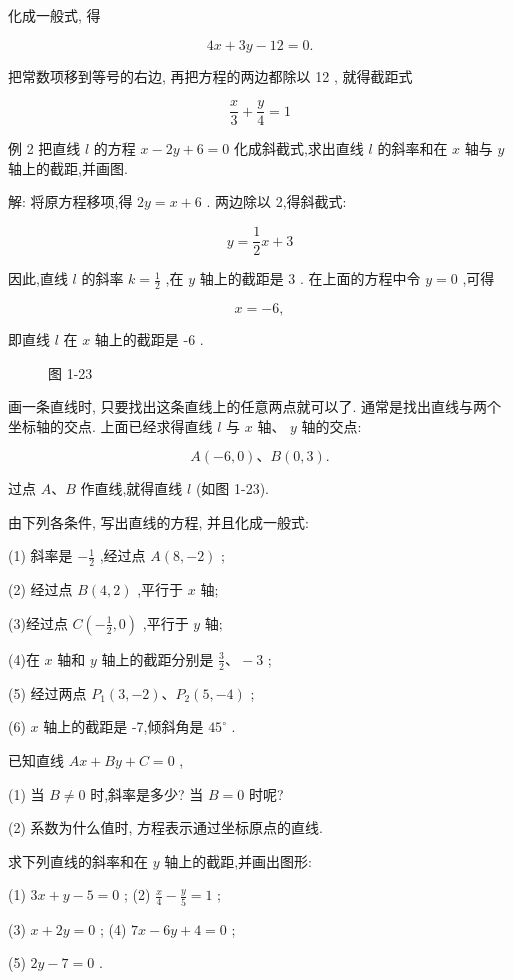 \documentclass[lang=cn,newtx,10.5pt,scheme=chinese]{elegantbook}
\begin{document}
化成一般式, 得

\[
    {4x} + {3y} - {12} = 0.
\]

把常数项移到等号的右边, 再把方程的两边都除以 12 , 就得截距式

\[
  \frac{x}{3} + \frac{y}{4} = 1
\]

例 2 把直线 \(l\) 的方程 \(x - {2y} + 6 = 0\) 化成斜截式,求出直线 \(l\) 的斜率和在 \(x\) 轴与 \(y\) 轴上的截距,并画图.

解: 将原方程移项,得 \({2y} = x + 6\) . 两边除以 2,得斜截式:

\[
  y = \frac{1}{2}x + 3
\]

因此,直线 \(l\) 的斜率 \(k = \frac{1}{2}\) ,在 \(y\) 轴上的截距是 3 . 在上面的方程中令 \(y = 0\) ,可得

\[
  x = - 6,
\]

即直线 \(l\) 在 \(x\) 轴上的截距是 -6 .

\begin{figure}[h]
  \centering
  
  \caption{图 1-23}
\end{figure}

画一条直线时, 只要找出这条直线上的任意两点就可以了. 通常是找出直线与两个坐标轴的交点. 上面已经求得直线 \(l\) 与 \(x\) 轴、 \(y\) 轴的交点:

\[
  A\left( {-6,0}\right) \text{、}B\left( {0,3}\right) \text{.}
\]

过点 \(A\text{、}B\) 作直线,就得直线 \(l\) (如图 1-23).

\begin{problemset}[练习]

\item 由下列各条件, 写出直线的方程, 并且化成一般式:

(1) 斜率是 \(- \frac{1}{2}\) ,经过点 \(A\left( {8, - 2}\right)\) ;

(2) 经过点 \(B\left( {4,2}\right)\) ,平行于 \(x\) 轴;

(3)经过点 \(C\left( {-\frac{1}{2},0}\right)\) ,平行于 \(y\) 轴;

(4)在 \(x\) 轴和 \(y\) 轴上的截距分别是 \(\frac{3}{2}\text{、} - 3\) ;

(5) 经过两点 \({P}_{1}\left( {3, - 2}\right) \text{、}{P}_{2}\left( {5, - 4}\right)\) ;

(6) \(x\) 轴上的截距是 -7,倾斜角是 \({45}^{ \circ }\) .

\item 已知直线 \({Ax} + {By} + C = 0\) ,

(1) 当 \(B \neq 0\) 时,斜率是多少? 当 \(B = 0\) 时呢?

(2) 系数为什么值时, 方程表示通过坐标原点的直线.

\item 求下列直线的斜率和在 \(y\) 轴上的截距,并画出图形:

(1) \({3x} + y - 5 = 0\) ; (2) \(\frac{x}{4} - \frac{y}{5} = 1\) ;

(3) \(x + {2y} = 0\) ; (4) \({7x} - {6y} + 4 = 0\) ;

(5) \({2y} - 7 = 0\) .

\end{problemset}
\end{document}
